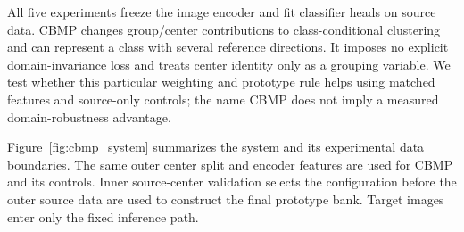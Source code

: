 All five experiments freeze the image encoder and fit classifier heads on source data. CBMP changes group/center contributions to class-conditional clustering and can represent a class with several reference directions. It imposes no explicit domain-invariance loss and treats center identity only as a grouping variable. We test whether this particular weighting and prototype rule helps using matched features and source-only controls; the name CBMP does not imply a measured domain-robustness advantage.

Figure~\ref{fig:cbmp_system} summarizes the system and its experimental data boundaries. The same outer center split and encoder features are used for CBMP and its controls. Inner source-center validation selects the configuration before the outer source data are used to construct the final prototype bank. Target images enter only the fixed inference path.

